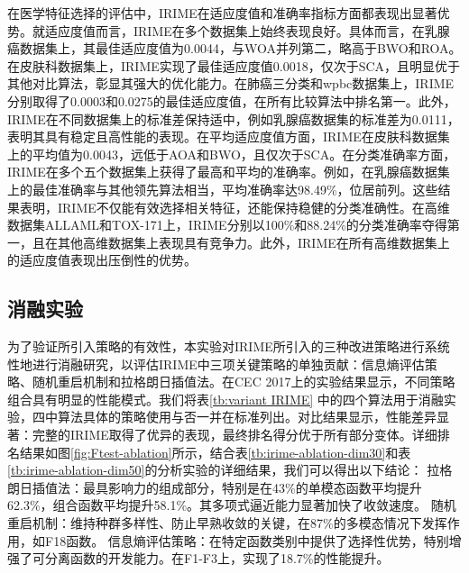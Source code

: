 \documentclass{wzuthesis}
\begin{document}
在医学特征选择的评估中，IRIME在适应度值和准确率指标方面都表现出显著优势。就适应度值而言，IRIME在多个数据集上始终表现良好。具体而言，在乳腺癌数据集上，其最佳适应度值为0.0044，与WOA并列第二，略高于BWO和ROA。在皮肤科数据集上，IRIME实现了最佳适应度值0.0018，仅次于SCA，且明显优于其他对比算法，彰显其强大的优化能力。在肺癌三分类和wpbc数据集上，IRIME分别取得了0.0003和0.0275的最佳适应度值，在所有比较算法中排名第一。此外，IRIME在不同数据集上的标准差保持适中，例如乳腺癌数据集的标准差为0.0111，表明其具有稳定且高性能的表现。在平均适应度值方面，IRIME在皮肤科数据集上的平均值为0.0043，远低于AOA和BWO，且仅次于SCA。在分类准确率方面，IRIME在多个五个数据集上获得了最高和平均的准确率。例如，在乳腺癌数据集上的最佳准确率与其他领先算法相当，平均准确率达98.49\%，位居前列。这些结果表明，IRIME不仅能有效选择相关特征，还能保持稳健的分类准确性。在高维数据集ALLAML和TOX-171上，IRIME分别以100\%和88.24\%的分类准确率夺得第一，且在其他高维数据集上表现具有竞争力。此外，IRIME在所有高维数据集上的适应度值表现出压倒性的优势。


\subsection{消融实验}
为了验证所引入策略的有效性，本实验对IRIME所引入的三种改进策略进行系统性地进行消融研究，以评估IRIME中三项关键策略的单独贡献：信息熵评估策略、随机重启机制和拉格朗日插值法。在CEC 2017上的实验结果显示，不同策略组合具有明显的性能模式。我们将表\ref{tb:variant IRIME} 中的四个算法用于消融实验，四中算法具体的策略使用与否一并在标准列出。对比结果显示，性能差异显著：完整的IRIME取得了优异的表现，最终排名得分优于所有部分变体。详细排名结果如图\ref{fig:Ftest-ablation}所示，结合表\ref{tb:irime-ablation-dim30}和表\ref{tb:irime-ablation-dim50}的分析实验的详细结果，我们可以得出以下结论：
拉格朗日插值法：最具影响力的组成部分，特别是在43\%的单模态函数平均提升62.3\%，组合函数平均提升58.1\%。其多项式逼近能力显著加快了收敛速度。
随机重启机制：维持种群多样性、防止早熟收敛的关键，在87\%的多模态情况下发挥作用，如F18函数。
信息熵评估策略：在特定函数类别中提供了选择性优势，特别增强了可分离函数的开发能力。在F1-F3上，实现了18.7\%的性能提升。
\end{document}
